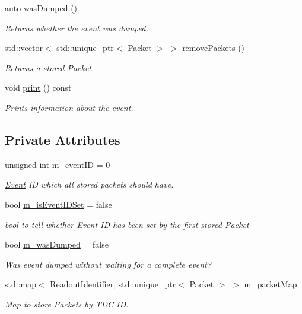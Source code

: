 \begin{DoxyCompactItemize}
auto \hyperlink{class_event_a51ba784cf88a5f581d426e9a8c6f4764}{was\+Dumped} ()
\begin{DoxyCompactList}\small\item\em Returns whether the event was dumped. \end{DoxyCompactList}\item 
std\+::vector$<$ std\+::unique\+\_\+ptr$<$ \hyperlink{class_packet}{Packet} $>$ $>$ \hyperlink{class_event_a4a7c0f87ea9fd8526451d6eddc3a592e}{remove\+Packets} ()
\begin{DoxyCompactList}\small\item\em Returns a stored \hyperlink{class_packet}{Packet}. \end{DoxyCompactList}\item 
void \hyperlink{class_event_ab1b48a39a41a7fc92a25617adcf68aa8}{print} () const
\begin{DoxyCompactList}\small\item\em Prints information about the event. \end{DoxyCompactList}\end{DoxyCompactItemize}
\subsection*{Private Attributes}
\begin{DoxyCompactItemize}
\item 
unsigned int \hyperlink{class_event_af0c352ab6a128f9df56b231d941aff25}{m\+\_\+event\+ID} = 0
\begin{DoxyCompactList}\small\item\em \hyperlink{class_event}{Event} ID which all stored packets should have. \end{DoxyCompactList}\item 
bool \hyperlink{class_event_a3b435b2fe840647c01ae0ee838b66a54}{m\+\_\+is\+Event\+I\+D\+Set} = false
\begin{DoxyCompactList}\small\item\em bool to tell whether \hyperlink{class_event}{Event} ID has been set by the first stored \hyperlink{class_packet}{Packet} \end{DoxyCompactList}\item 
bool \hyperlink{class_event_adf297e8a9a7f7e7496dbb2e1ea61c893}{m\+\_\+was\+Dumped} = false
\begin{DoxyCompactList}\small\item\em Was event dumped without waiting for a complete event? \end{DoxyCompactList}\item 
std\+::map$<$ \hyperlink{class_readout_identifier}{Readout\+Identifier}, std\+::unique\+\_\+ptr$<$ \hyperlink{class_packet}{Packet} $>$ $>$ \hyperlink{class_event_a0ae595a22c44ddc6003ac31ee17f6f86}{m\+\_\+packet\+Map}
\begin{DoxyCompactList}\small\item\em Map to store Packets by T\+DC ID. \end{DoxyCompactList}\end{DoxyCompactItemize}


